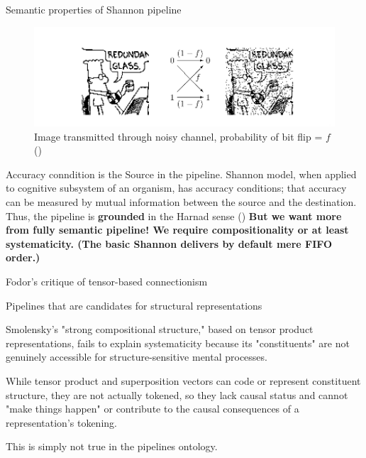 \documentclass[10pt, aspectratio=169, handout]{beamer}
\begin{document}
\begin{frame}[label=semantic_shannon]{ Semantic properties of Shannon pipeline }

        \begin{figure}[h!]
            \centering
            \includegraphics[width=1\linewidth]{images/Dilbert.png}
            \caption{Image transmitted through noisy channel, probability of bit flip = $f$ (\cite{MacKay2003})}
        \end{figure}
    

        Accuracy conndition is the Source in the pipeline.
        Shannon model, when applied to cognitive subsystem of an organism, has accuracy conditions; that accuracy can be measured by mutual information between the source and the destination. Thus, the pipeline is \textbf{grounded} in the Harnad sense (\cite{harnad_symbol_1990})
\textbf{        But we want more from fully semantic pipeline! We require compositionality or at least systematicity.  (The basic Shannon  delivers by default mere FIFO order.)
}
\end{frame}



\begin{frame}[label=structural_candidate]{Fodor's critique of tensor-based connectionism }
    \begin{center}
      \Huge Pipelines that are candidates for structural representations
     \end{center}

   \small Smolensky's "strong compositional structure," based on tensor product representations, fails to explain systematicity because its "constituents" are not genuinely accessible for structure-sensitive mental processes. \autocite{fodorConnectionismProblemSystematicity1990}

    While tensor product and superposition vectors can code or represent constituent structure, they are not actually tokened, so they lack causal status and cannot "make things happen" or contribute to the causal consequences of a representation's tokening.

    This is simply not true in the pipelines ontology. 




\end{frame}
\end{document}
